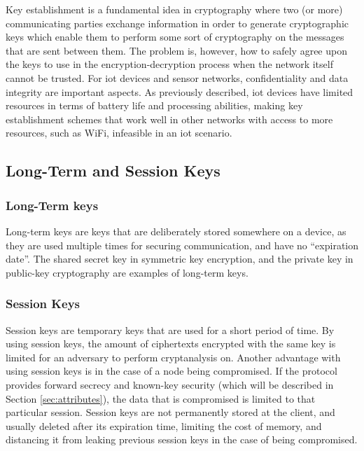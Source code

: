 Key establishment is a fundamental idea in cryptography where two (or more) communicating parties exchange information in order to generate cryptographic keys which enable them to perform some sort of cryptography on the messages that are sent between them. The problem is, however, how to safely agree upon the keys to use in the encryption-decryption process when the network itself cannot be trusted. For \gls{iot} devices and sensor networks, confidentiality and data integrity are important aspects. As previously described, \gls{iot} devices have limited resources in terms of battery life and processing abilities, making key establishment schemes that work well in other networks with access to more resources, such as WiFi, infeasible in an \gls{iot} scenario.


\subsection{Long-Term and Session Keys}


\subsubsection{Long-Term keys}

Long-term keys are keys that are deliberately stored somewhere on a device, as they are used multiple times for securing communication, and have no ``expiration date''. The shared secret key in symmetric key encryption, and the private key in public-key cryptography are examples of long-term keys.


\subsubsection{Session Keys}

Session keys are temporary keys that are used for a short period of time. By using session keys, the amount of ciphertexts encrypted with the same key is limited for an adversary to perform cryptanalysis on. Another advantage with using session keys is in the case of a node being compromised. If the protocol provides forward secrecy and known-key security (which will be described in Section \ref{sec:attributes}), the data that is compromised is limited to that particular session. Session keys are not permanently stored at the client, and usually deleted after its expiration time, limiting the cost of memory, and distancing it from leaking previous session keys in the case of being compromised.



